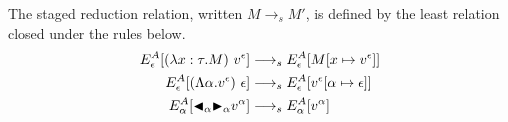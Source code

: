 \begin{definition}
	The staged reduction relation, written $M \longrightarrow_s M'$, is defined by 
	the least relation closed under the rules below.
		\begin{align*}
			E^A_\epsilon [(\lambda x:\tau.M)\ v^\epsilon]       & \longrightarrow_s E^A_\epsilon[M[x\mapsto v^\epsilon]]             \\
			E^A_\epsilon [(\Lambda\alpha.v^\epsilon)\ \epsilon] & \longrightarrow_s E^A_\epsilon[v^\epsilon[\alpha\mapsto \epsilon]] \\
			E^A_\alpha [{\mathop{\blacktriangleleft}}_\alpha {\mathop{\blacktriangleright}}_\alpha v^\alpha]        & \longrightarrow_s E^A_\alpha[v^\alpha]                             \\
		\end{align*}
\end{definition}

